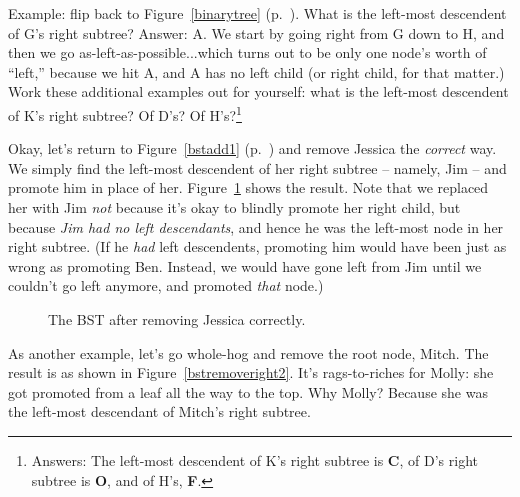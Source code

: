Example: flip back to Figure~\ref{binarytree} (p.~\pageref{binarytree}). What
is the left-most descendent of G's right subtree? Answer: A. We start by going
right from G down to H, and then we go as-left-as-possible...which turns out to
be only one node's worth of ``left,'' because we hit A, and A has no left child
(or right child, for that matter.) Work these additional examples out for
yourself: what is the left-most descendent of K's right subtree? Of D's? Of
H's?\footnote{Answers: The left-most descendent of K's right subtree is
\textbf{C}, of D's right subtree is \textbf{O}, and of H's, \textbf{F}.}

Okay, let's return to Figure~\ref{bstadd1} (p.~\pageref{bstadd1}) and remove
Jessica the \textit{correct} way. We simply find the left-most descendent of
her right subtree -- namely, Jim -- and promote him in place of her.
Figure~\ref{bstremoveright} shows the result. Note that we replaced her with
Jim \textit{not} because it's okay to blindly promote her right child, but
because \textit{Jim had no left descendants}, and hence he was the left-most
node in her right subtree. (If he \textit{had} left descendents, promoting him
would have been just as wrong as promoting Ben. Instead, we would have gone
left from Jim until we couldn't go left anymore, and promoted \textit{that}
node.)

\begin{figure}[ht]
\centering
\begin{custommargins}{-2.1cm}{-3cm}
\caption{The BST after removing Jessica correctly.}
\label{bstremoveright}
\end{custommargins}
\end{figure}

As another example, let's go whole-hog and remove the root node, Mitch. The
result is as shown in Figure~\ref{bstremoveright2}. It's rags-to-riches for
Molly: she got promoted from a leaf all the way to the top. Why Molly?
Because she was the left-most descendant of Mitch's right subtree.

